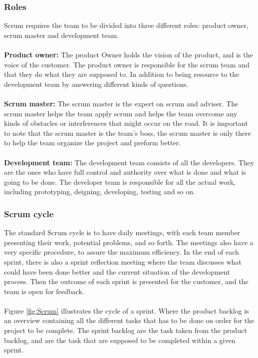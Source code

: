\subsubsection{Roles}
Scrum requires the team to be divided into three different roles: product owner, scrum master and development team. \\
\\
\textbf{Product owner:} The product Owner holds the vision of the product, and is the voice of the customer. The product owner is responsible for the scrum team and that they do what they are supposed to. In addition to being resource to the development team by answering different kinds of questions.\cite{agilelearning}\\
\\
\textbf{Scrum master:} The scrum master is the expert on scrum and adviser. The scrum master helps the team apply scrum and helps the team overcome any kinds of obstacles or interferences that might occur on the road. It is important to note that the scrum master is the team's boss, the scrum master is only there to help the team organize the project and preform better.\cite{agilelearning}\\
\\
\textbf{Development team:} The development team consists of all the developers. They are the ones who have full control and authority over what is done and what is going to be done. The developer team is responsible for all the actual work, including prototyping, deigning, developing, testing and so on.\cite{agilelearning}

\subsubsection{Scrum cycle}
The standard Scrum cycle is to have daily meetings, with each team member presenting their work, potential problems, and so forth. The meetings also have a very specific procedure, to assure the maximum efficiency. In the end of each sprint, there is also a sprint reflection meeting where the team discusses what could have been done better and the current situation of the development process. Then the outcome of each sprint is presented for the customer, and the team is open for feedback.\cite{agilelearning}\\
\\
Figure \ref{fig:Scrum} illustrates the cycle of a sprint. Where the product backlog is an overview containing all the different tasks that has to be done on order for the project to be complete. The sprint backlog are the task taken from the product backlog, and are the task that are supposed to be completed within a given sprint.

